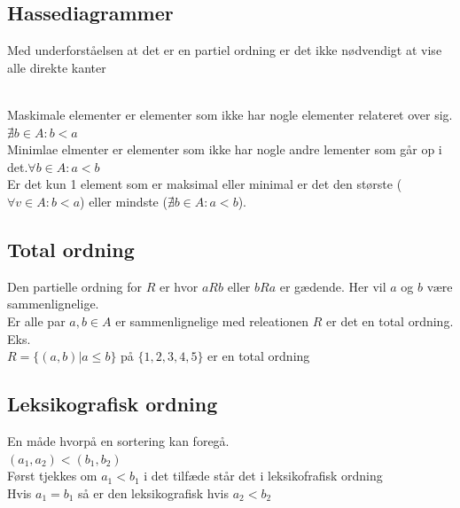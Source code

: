 \documentclass[12pt, a4paper]{article}
\begin{document}
				\subsection{Hassediagrammer}
				Med underforståelsen at det er en partiel ordning er det ikke nødvendigt at vise alle direkte kanter\\
				\\
					Maskimale elementer er elementer som ikke har nogle elementer relateret over sig. $\nexists b\in A: b<a$\\
					Minimlae elmenter er elementer som ikke har nogle andre lementer som går op i det.$\forall b \in A: a<b$\\
					Er det kun 1 element som er maksimal eller minimal er det den største ($\forall v \in A: b<a$) eller mindste ($\nexists b \in A: a<b$).\\
					
				\subsection{Total ordning}
					Den partielle ordning for $R$ er hvor $a R b$ eller $b R a$ er gædende. Her vil $a$ og $b$ være sammenlignelige.\\
					Er alle  par $a,b \in A$ er sammenlignelige med releationen $R$ er det en total ordning.
					Eks. \\
					$R=\{(a,b)|a\leq b\}$ på $\{1,2,3,4,5\}$ er en total ordning\\
				\subsection{Leksikografisk ordning}
					En måde hvorpå en sortering kan foregå.\\
					$(a_1,a_2)<(b_1,b_2)$\\
					Først tjekkes om $a_1<b_1$ i det tilfæde står det i leksikofrafisk ordning\\
					Hvis $a_1=b_1$ så er den leksikografisk hvis $a_2<b_2$
\end{document}
